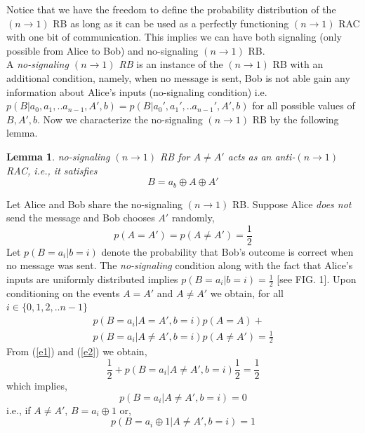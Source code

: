 \documentclass[%
 reprint,
 amsmath,amssymb,
 aps,
]{revtex4-1}
\newtheorem{mydef2}{Lemma}
\begin{document}
\noindent Notice that we have the freedom to define the probability distribution of the $(n\rightarrow 1)$ RB as long as it can be used as a perfectly functioning $(n\rightarrow 1)$ RAC with one bit of communication. This implies we can have both signaling (only possible from Alice to Bob) and no-signaling  $(n\rightarrow 1)$ RB. \\ A \textit{no-signaling $(n\rightarrow1)$ RB} is an instance of the $(n\rightarrow1)$ RB with an additional condition, namely, when no message is sent, Bob is not able gain any information about Alice's inputs (no-signaling condition) i.e. $p(B|a_0,a_1,..a_{n-1},A',b)=p(B|a_0',a_1',..a_{n-1}',A',b)$ for all possible values of $B,A',b$. Now we characterize the no-signaling $(n\rightarrow 1)$ RB by the following lemma.
\begin{mydef2} \label{lem1}
no-signaling $(n\rightarrow 1)$ RB for $A\neq A'$ acts as an anti-$(n\rightarrow 1)$ RAC, i.e., it satisfies
\begin{equation} \label{el1}
B=a_b\oplus A \oplus A'
\end{equation}
\end{mydef2}
Let Alice and Bob share the no-signaling $(n\rightarrow 1)$ RB. Suppose Alice \textit{does not} send the message and Bob chooses $A'$ randomly, 
\begin{equation}\label{e2}
p(A=A')=p(A\neq A')=\frac{1}{2}
\end{equation}
Let $p(B=a_i|b=i)$ denote the probability that Bob's outcome is correct when no message was sent. The \textit{no-signaling} condition along with the fact that Alice's inputs are uniformly distributed implies $p(B=a_i|b=i)=\frac{1}{2}$ [see FIG. 1]. Upon conditioning on the events $A=A'$ and $A\neq A'$ we obtain, for all $i\in\{0,1,2,..n-1\}$ 
\begin{eqnarray}
p(B=a_i|A=A',b=i)p(A=A)+\nonumber \\ p(B=a_i|A\neq A',b=i)p(A\neq A')=\frac{1}{2}
\end{eqnarray}
From (\ref{e1}) and (\ref{e2}) we obtain, 
\begin{equation}
\frac{1}{2}+p(B=a_i|A\neq A',b=i)\frac{1}{2}=\frac{1}{2}
\end{equation}
which implies, 
\begin{equation}
p(B=a_i|A\neq A',b=i)=0
\end{equation}
i.e., if $A\neq A'$, $B=a_i\oplus 1$ or, 
\begin{equation} \label{e7}
p(B=a_i\oplus 1|A\neq A',b=i)=1
\end{equation}
\end{document}
